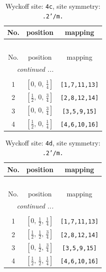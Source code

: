 \documentclass[fleqn,8pt]{jsarticle}
\begin{document}
\renewcommand{\arraystretch}{1.2}
\begin{longtable}{ccc}
\caption{Wyckoff site: {\tt 4c}, site symmetry: {\tt .2'/m.}}
 \\
 \hline \hline
No. & position & mapping \\ \hline \endfirsthead

\multicolumn{2}{l}{\tablename\ \thetable{}} \\
 \hline \hline
No. & position & mapping \\ \hline \endhead

 \hline \hline
\multicolumn{2}{r}{\footnotesize\it continued ...} \\ \endfoot

 \hline \hline
\multicolumn{2}{r}{} \\ \endlastfoot

1 & $\left[ 0,\, 0,\, \frac{1}{4} \right]$ & {\tt [1,7,11,13]} \\ \hline
2 & $\left[ \frac{1}{2},\, 0,\, \frac{3}{4} \right]$ & {\tt [2,8,12,14]} \\ \hline
3 & $\left[ 0,\, 0,\, \frac{3}{4} \right]$ & {\tt [3,5,9,15]} \\ \hline
4 & $\left[ \frac{1}{2},\, 0,\, \frac{1}{4} \right]$ & {\tt [4,6,10,16]} \\
\end{longtable}
\renewcommand{\arraystretch}{1.2}
\begin{longtable}{ccc}
\caption{Wyckoff site: {\tt 4d}, site symmetry: {\tt .2'/m.}}
 \\
 \hline \hline
No. & position & mapping \\ \hline \endfirsthead

\multicolumn{2}{l}{\tablename\ \thetable{}} \\
 \hline \hline
No. & position & mapping \\ \hline \endhead

 \hline \hline
\multicolumn{2}{r}{\footnotesize\it continued ...} \\ \endfoot

 \hline \hline
\multicolumn{2}{r}{} \\ \endlastfoot

1 & $\left[ 0,\, \frac{1}{2},\, \frac{1}{4} \right]$ & {\tt [1,7,11,13]} \\ \hline
2 & $\left[ \frac{1}{2},\, \frac{1}{2},\, \frac{3}{4} \right]$ & {\tt [2,8,12,14]} \\ \hline
3 & $\left[ 0,\, \frac{1}{2},\, \frac{3}{4} \right]$ & {\tt [3,5,9,15]} \\ \hline
4 & $\left[ \frac{1}{2},\, \frac{1}{2},\, \frac{1}{4} \right]$ & {\tt [4,6,10,16]} \\
\end{longtable}
\end{document}
